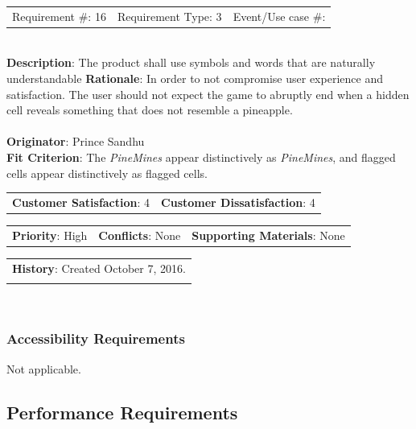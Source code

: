 \documentclass[12pt, titlepage]{article}
\begin{document}
\begin{reqbox}

\begin{tabular}{lll}
Requirement \#: 16 & Requirement Type: 3 & Event/Use case \#: \\
\end{tabular} \\

\textbf{Description}: The product shall use symbols and words that are naturally understandable 
\textbf{Rationale}: In order to not compromise user experience and satisfaction. The user should not expect 
the game to abruptly end when a hidden cell reveals something that does not resemble a pineapple. \\ \\
\textbf{Originator}: Prince Sandhu \\
\textbf{Fit Criterion}: The \textit{PineMines} appear distinctively as \textit{PineMines}, and flagged cells appear distinctively as flagged
cells. \\

\begin{tabular}{ll}
\textbf{Customer Satisfaction}: 4 & \textbf{Customer Dissatisfaction}: 4 \\
\end{tabular}

\begin{tabular}{lll}
\textbf{Priority}: High & \textbf{Conflicts}: None & \textbf{Supporting Materials}: None \\
\end{tabular}

\begin{tabular}{l}
\textbf{History}: Created October 7, 2016.\\ \\
\end{tabular} \\

\end{reqbox}
\subsubsection{Accessibility Requirements}
Not applicable.

\subsection{Performance Requirements}
\end{document}
